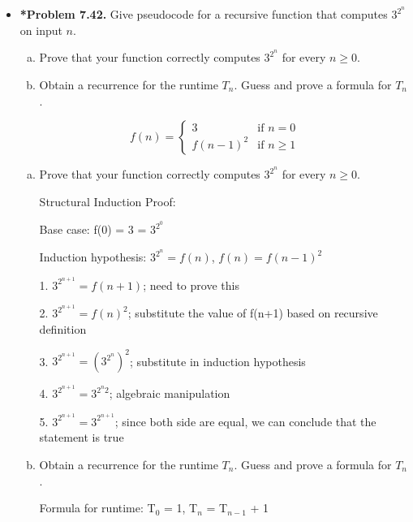 \documentclass[11pt]{article}
\begin{document}
\begin{itemize}
\vspace{0.1in}

\item \textbf{*Problem 7.42.}
Give pseudocode for a recursive function that computes $3^{2^n}$ on input $n$.
\begin{enumerate}[(a)]
\item Prove that your function correctly computes $3^{2^n}$ for every $n\ge 0$.
\item Obtain a recurrence for the runtime $T_n$.
  Guess and prove a formula for $T_n$.
\end{enumerate}

\begin{equation}
  f(n) =
  \begin{cases}
      3 & \text{if } n = 0 \\
      f(n-1)^2 & \text{if } n \geq 1  
  \end{cases}
  \end{equation}
  \begin{enumerate}[(a)]
  \item Prove that your function correctly computes $3^{2^n}$ for every $n\ge 0$.
  
  \begin{center}
      Structural Induction Proof:
  \end{center}
  
  Base case:
  f(0) = 3 = $3^{2^{0}}$
  
  Induction hypothesis: $3^{2^{n}} = f(n)$, $f(n)=f(n-1)^2$
  
  1. $3^{2^{n+1}} = f(n+1)$; need to prove this
  
  2. $3^{2^{n+1}} = f(n)^2$; substitute the value of f(n+1) based on recursive definition
  
  3. $3^{2^{n+1}} = (3^{2^{n}})^2$; substitute in induction hypothesis
  
  4. $3^{2^{n+1}} = 3^{2^{n}2}$; algebraic manipulation
  
  5. $3^{2^{n+1}} = 3^{2^{n+1}}$; since both side are equal, we can conclude that the statement is true
  
  
  
  \vspace{0.3in}
  
  \item Obtain a recurrence for the runtime $T_n$.
    Guess and prove a formula for $T_n$.
  
  \begin{center}
      Formula for runtime: T$_{0}$ = 1, T$_{n}$ = T$_{n-1}$ + 1
  \end{center}
  

\end{enumerate}
\end{itemize}
\end{document}
